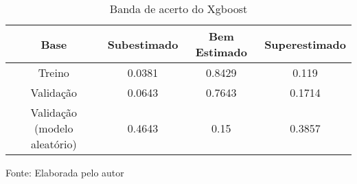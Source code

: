 
\begin{table}[h]
\centering
\caption{Banda de acerto do Xgboost}
\label{tab:cap3_band_xgboost}
\begin{tabular}{cccc}
Base & Subestimado & Bem Estimado & Superestimado \\
\hline
Treino & 0.0381 & 0.8429 & 0.119 \\
Validação & 0.0643 & 0.7643 & 0.1714 \\
Validação (modelo aleatório) & 0.4643 & 0.15 & 0.3857 \\
\hline
\end{tabular}

Fonte: Elaborada pelo autor
\end{table}
